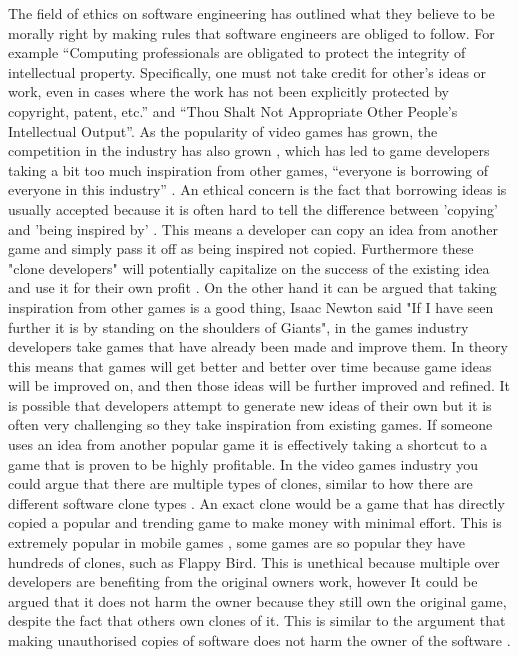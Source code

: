 \documentclass{scrartcl}
\begin{document}
The field of ethics on software engineering has outlined what they believe to be morally right by making rules that software engineers are obliged to follow. For example ``Computing professionals are obligated to protect the integrity of intellectual property. Specifically, one must not take credit for other's ideas or work, even in cases where the work has not been explicitly protected by copyright, patent, etc.'' \cite{Code-of-Ethics} and ``Thou Shalt Not Appropriate Other People’s Intellectual Output''. As the popularity of video games has grown, the competition in the industry has also grown \cite{adaptation}, which has led to game developers taking a bit too much inspiration from other games, ``everyone is borrowing of everyone in this industry'' \cite{ClashOfClones}. An ethical concern is the fact that borrowing ideas is usually accepted because it is often hard to tell the difference between 'copying' and 'being inspired by' \cite{GameDesignIdeas}. This means a developer can copy an idea from another game and simply pass it off as being inspired not copied. Furthermore these "clone developers" will potentially capitalize on the success of the existing idea and use it for their own profit \cite{AttackOfTheClones}. On the other hand it can be argued that taking inspiration from other games is a good thing, Isaac Newton said "If I have seen further it is by standing on the shoulders of Giants", in the games industry developers take games that have already been made and improve them. In theory this means that games will get better and better over time because game ideas will be improved on, and then those ideas will be further improved and refined. It is possible that developers attempt to generate new ideas of their own but it is often very challenging \cite{Creativity} so they take inspiration from existing games. If someone uses an idea from another popular game it is effectively taking a shortcut to a game that is proven to be highly profitable. In the video games industry you could argue that there are multiple types of clones, similar to how there are different software clone types \cite{SoftCloning,PlagiarismDetect}. An exact clone would be a game that has directly copied a popular and trending game to make money with minimal effort. This is extremely popular in mobile games \cite{tatap,zoomIOS}, some games are so popular they have hundreds of clones, such as Flappy Bird. This is unethical because multiple over developers are benefiting from the original owners work, however It could be argued that it does not harm the owner because they still own the original game, despite the fact that others own clones of it. This is similar to the argument that making unauthorised copies of software does not harm the owner of the software \cite{Unauthorized}.
\end{document}
